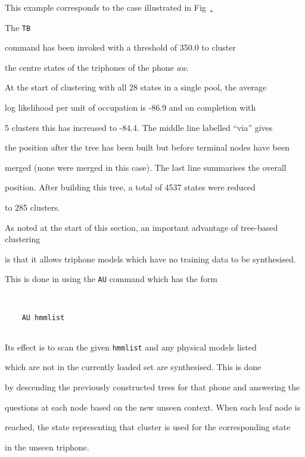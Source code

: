 This example corresponds to the case illustrated in Fig~\href{f:qstree}.


The \texttt{TB}


command has been invoked with a  threshold of 350.0 to cluster


the centre states of the triphones of the phone \textit{aw}.


At the start of clustering with all 28 states in a single pool, the average


log likelihood per unit of occupation is -86.9 and on completion with


5 clusters this has increased to -84.4.  The middle line labelled ``via'' gives


the position after the tree has been built but before terminal nodes have been


merged (none were merged in this case).  The last line summarises the overall


position.  After building this tree, a total of 4537 states were reduced


to 285 clusters.





As noted at the start of this section, an important advantage of tree-based clustering


is that it allows triphone models which have no training data to be synthesised.


This is done in  using the \texttt{AU} command which has the form


\begin{verbatim}


    AU hmmlist


\end{verbatim}


Its effect is to scan the given \texttt{hmmlist} and any physical models listed


which are not in the currently loaded set are synthesised.  This is done 


by descending the previously constructed trees for that phone and answering the


questions at each node based on the new unseen context.  When each leaf node is


reached, the state representing that cluster is used for the corresponding state


in the unseen triphone.






